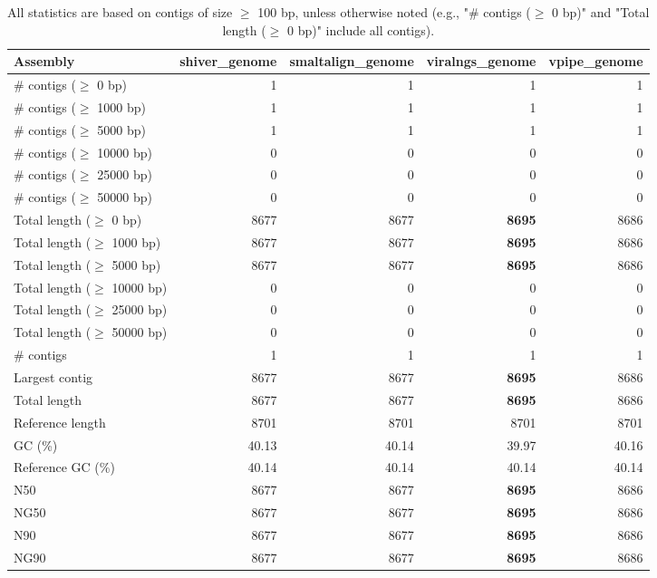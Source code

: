 \documentclass[12pt,a4paper]{article}
\begin{document}
\begin{table}[ht]
\begin{center}
\caption{All statistics are based on contigs of size $\geq$ 100 bp, unless otherwise noted (e.g., "\# contigs ($\geq$ 0 bp)" and "Total length ($\geq$ 0 bp)" include all contigs).}
\begin{tabular}{|l*{4}{|r}|}
\hline
Assembly & shiver\_genome & smaltalign\_genome & viralngs\_genome & vpipe\_genome \\ \hline
\# contigs ($\geq$ 0 bp) & 1 & 1 & 1 & 1 \\ \hline
\# contigs ($\geq$ 1000 bp) & 1 & 1 & 1 & 1 \\ \hline
\# contigs ($\geq$ 5000 bp) & 1 & 1 & 1 & 1 \\ \hline
\# contigs ($\geq$ 10000 bp) & 0 & 0 & 0 & 0 \\ \hline
\# contigs ($\geq$ 25000 bp) & 0 & 0 & 0 & 0 \\ \hline
\# contigs ($\geq$ 50000 bp) & 0 & 0 & 0 & 0 \\ \hline
Total length ($\geq$ 0 bp) & 8677 & 8677 & {\bf 8695} & 8686 \\ \hline
Total length ($\geq$ 1000 bp) & 8677 & 8677 & {\bf 8695} & 8686 \\ \hline
Total length ($\geq$ 5000 bp) & 8677 & 8677 & {\bf 8695} & 8686 \\ \hline
Total length ($\geq$ 10000 bp) & 0 & 0 & 0 & 0 \\ \hline
Total length ($\geq$ 25000 bp) & 0 & 0 & 0 & 0 \\ \hline
Total length ($\geq$ 50000 bp) & 0 & 0 & 0 & 0 \\ \hline
\# contigs & 1 & 1 & 1 & 1 \\ \hline
Largest contig & 8677 & 8677 & {\bf 8695} & 8686 \\ \hline
Total length & 8677 & 8677 & {\bf 8695} & 8686 \\ \hline
Reference length & 8701 & 8701 & 8701 & 8701 \\ \hline
GC (\%) & 40.13 & 40.14 & 39.97 & 40.16 \\ \hline
Reference GC (\%) & 40.14 & 40.14 & 40.14 & 40.14 \\ \hline
N50 & 8677 & 8677 & {\bf 8695} & 8686 \\ \hline
NG50 & 8677 & 8677 & {\bf 8695} & 8686 \\ \hline
N90 & 8677 & 8677 & {\bf 8695} & 8686 \\ \hline
NG90 & 8677 & 8677 & {\bf 8695} & 8686 \\ \hline

\end{tabular}
\end{center}
\end{table}
\end{document}
